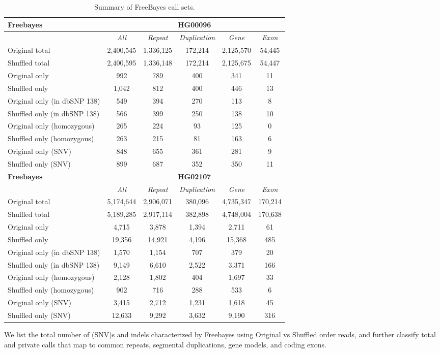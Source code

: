 \begin{table}[htb]
\caption{ Summary of FreeBayes call sets. }
\begin{center}
\begin{tabular}{|l|c||c|c|c|c|}
\hline
{\bf Freebayes} & \multicolumn{5}{|c|}{\bf HG00096} \\
\hline
\cline{2-6}
{\bf} & {\it All} & {\it Repeat} & {\it Duplication} & {\it Gene} & {\it Exon} \\
\hline
Original total & 2,400,545 & 1,336,125 & 172,214 & 2,125,570 & 54,445 \\
\hline
Shuffled total & 2,400,595 & 1,336,148 & 172,214 & 2,125,675 & 54,447 \\
\hline
Original only & 992 & 789 & 400 & 341 & 11 \\
\hline
Shuffled only & 1,042 & 812 & 400 & 446 & 13 \\
\hline
Original only (in dbSNP 138) & 549 & 394 & 270 & 113 & 8 \\
\hline
Shuffled only (in dbSNP 138) & 566 & 399 & 250 & 138 & 10 \\
\hline
Original only (homozygous) & 265 & 224 & 93 & 125 & 0 \\
\hline
Shuffled only (homozygous) & 263 & 215 & 81 & 163 & 6 \\
\hline
Original only (SNV) & 848 & 655 & 361 & 281 & 9 \\
\hline
Shuffled only (SNV) & 899 & 687 & 352 & 350 & 11 \\ 
\hline
\hline
{\bf Freebayes} & \multicolumn{5}{|c|}{\bf HG02107} \\
\hline
\cline{2-6}
{\bf} & {\it All} & {\it Repeat} & {\it Duplication} & {\it Gene} & {\it Exon} \\
\hline
Original total & 5,174,644 & 2,906,071 & 380,096 & 4,735,347 & 170,214 \\
\hline
Shuffled total & 5,189,285 & 2,917,114 & 382,898 & 4,748,004 & 170,638 \\
\hline
Original only & 4,715 & 3,878 & 1,394 & 2,711 & 61 \\
\hline
Shuffled only & 19,356 & 14,921 & 4,196 & 15,368 & 485 \\
\hline
Original only (in dbSNP 138) & 1,570 & 1,154 & 707 & 379 & 20 \\
\hline
Shuffled only (in dbSNP 138) & 9,149 & 6,610 & 2,522 & 3,371 & 166 \\
\hline
Original only (homozygous) & 2,128 & 1,802 & 404 & 1,697 & 33 \\
\hline
Shuffled only (homozygous) & 902 & 716 & 288 & 533 & 6 \\
\hline
Original only (SNV) & 3,415 & 2,712 & 1,231 & 1,618 & 45 \\
\hline
Shuffled only (SNV) & 12,633 & 9,292 & 3,632 & 9,190 & 316 \\  
\hline
\end{tabular}
\end{center}
{\footnotesize We list the total number of (SNV)s and indels characterized by Freebayes using Original vs Shuffled order reads, 
and further classify total and private calls that map to common repeats, segmental duplications, gene models, and coding exons.}
\label{supptab:orig-vs-shuf-freebayes}
\end{table}

